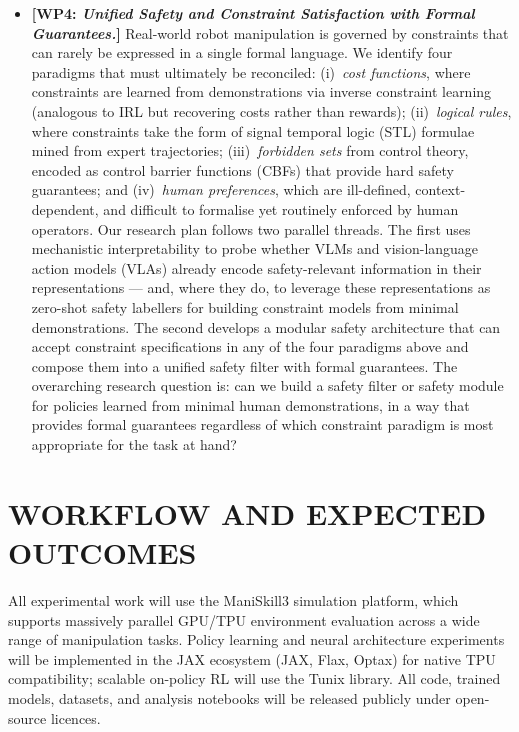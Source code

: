 \documentclass[11pt,a4paper]{article}
\begin{document}
\begin{itemize}[leftmargin=1.5em, itemsep=6pt]
\item \textbf{[WP4: \textit{Unified Safety and Constraint Satisfaction with Formal
Guarantees.}]}
  Real-world robot manipulation is governed by constraints that can rarely be expressed
  in a single formal language.
  We identify four paradigms that must ultimately be reconciled: (i)~\emph{cost
  functions}, where constraints are learned from demonstrations via inverse constraint
  learning (analogous to IRL but recovering costs rather than rewards); (ii)~\emph{logical
  rules}, where constraints take the form of signal temporal logic (STL) formulae mined
  from expert trajectories; (iii)~\emph{forbidden sets} from control theory, encoded as
  control barrier functions (CBFs) that provide hard safety guarantees; and (iv)~\emph{human
  preferences}, which are ill-defined, context-dependent, and difficult to formalise yet
  routinely enforced by human operators.
  Our research plan follows two parallel threads.
  The first uses mechanistic interpretability to probe whether VLMs and vision-language
  action models (VLAs) already encode safety-relevant information in their representations
  --- and, where they do, to leverage these representations as zero-shot safety labellers
  for building constraint models from minimal demonstrations.
  The second develops a modular safety architecture that can accept constraint
  specifications in any of the four paradigms above and compose them into a unified
  safety filter with formal guarantees.
  The overarching research question is: can we build a safety filter or safety module
  for policies learned from minimal human demonstrations, in a way that provides
  formal guarantees regardless of which constraint paradigm is most appropriate for
  the task at hand?

\end{itemize}

\section*{WORKFLOW AND EXPECTED OUTCOMES}

All experimental work will use the ManiSkill3 simulation platform, which supports
massively parallel GPU/TPU environment evaluation across a wide range of manipulation tasks.
Policy learning and neural architecture experiments will be implemented in the JAX
ecosystem (JAX, Flax, Optax) for native TPU compatibility; scalable on-policy RL
will use the Tunix library.
All code, trained models, datasets, and analysis notebooks will be released publicly
under open-source licences.
\end{document}
